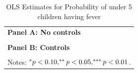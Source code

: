 \begin{table}[!ht]\centering
\caption{OLS Estimates for Probability of under 5 children having fever}\label{tab:Est_OLS_fever_full}
\begin{tabular}{l}
\hline \hline
\textbf{Panel A: No controls}\\[2pt]
\\[6pt]
\textbf{Panel B: Controls}\\[2pt]
\\[4pt]
\multicolumn{1}{p{0.95\linewidth}}{Notes: $\sym{*} p<0.10,\sym{**} p<0.05,\sym{***} p<0.01$.} \\
\hline
\end{tabular}
\end{table}
